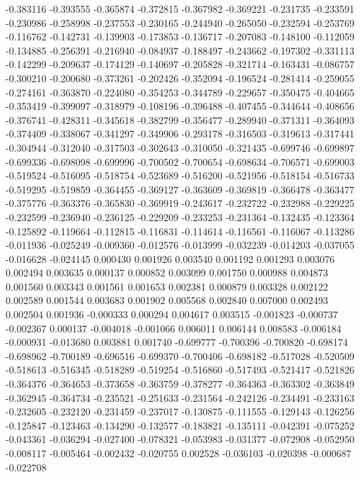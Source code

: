 -0.383116
-0.393555
-0.365874
-0.372815
-0.367982
-0.369221
-0.231735
-0.233591
-0.230986
-0.258998
-0.237553
-0.230165
-0.244940
-0.265050
-0.232594
-0.253769
-0.116762
-0.142731
-0.139903
-0.173853
-0.136717
-0.207083
-0.148100
-0.112059
-0.134885
-0.256391
-0.216940
-0.084937
-0.188497
-0.243662
-0.197302
-0.331113
-0.142299
-0.209637
-0.174129
-0.140697
-0.205828
-0.321714
-0.163431
-0.086757
-0.300210
-0.200680
-0.373261
-0.202426
-0.352094
-0.196524
-0.281414
-0.259055
-0.274161
-0.363870
-0.224080
-0.354253
-0.344789
-0.229657
-0.350475
-0.404665
-0.353419
-0.399097
-0.318979
-0.108196
-0.396488
-0.407455
-0.344644
-0.408656
-0.376741
-0.428311
-0.345618
-0.382799
-0.356477
-0.289940
-0.371311
-0.364093
-0.374409
-0.338067
-0.341297
-0.349906
-0.293178
-0.316503
-0.319613
-0.317441
-0.304944
-0.312040
-0.317503
-0.302643
-0.310050
-0.321435
-0.699746
-0.699897
-0.699336
-0.698098
-0.699996
-0.700502
-0.700654
-0.698634
-0.706571
-0.699003
-0.519524
-0.516095
-0.518754
-0.523689
-0.516200
-0.521956
-0.518154
-0.516733
-0.519295
-0.519859
-0.364455
-0.369127
-0.363609
-0.369819
-0.366478
-0.363477
-0.375776
-0.363376
-0.365830
-0.369919
-0.243617
-0.232722
-0.232988
-0.229225
-0.232599
-0.236940
-0.236125
-0.229209
-0.233253
-0.231364
-0.132435
-0.123364
-0.125892
-0.119664
-0.112815
-0.116831
-0.114614
-0.116561
-0.116067
-0.113286
-0.011936
-0.025249
-0.009360
-0.012576
-0.013999
-0.032239
-0.014203
-0.037055
-0.016628
-0.024145
0.000430
0.001926
0.003540
0.001192
0.001293
0.003076
0.002494
0.003635
0.000137
0.000852
0.003099
0.001750
0.000988
0.004873
0.001560
0.003343
0.001561
0.001653
0.002381
0.000879
0.003328
0.002122
0.002589
0.001544
0.003683
0.001902
0.005568
0.002840
0.007000
0.002493
0.002504
0.001936
-0.000333
0.000294
0.004617
0.003515
-0.001823
-0.000737
-0.002367
0.000137
-0.004018
-0.001066
0.006011
0.006144
0.008583
-0.006184
-0.000931
-0.013680
0.003881
0.001740
-0.699777
-0.700396
-0.700820
-0.698174
-0.698962
-0.700189
-0.696516
-0.699370
-0.700406
-0.698182
-0.517028
-0.520509
-0.518613
-0.516345
-0.518289
-0.519254
-0.516860
-0.517493
-0.521417
-0.521826
-0.364376
-0.364653
-0.373658
-0.363759
-0.378277
-0.364363
-0.363302
-0.363849
-0.362945
-0.364734
-0.235521
-0.251633
-0.231564
-0.242126
-0.234491
-0.233163
-0.232605
-0.232120
-0.231459
-0.237017
-0.130875
-0.111555
-0.129143
-0.126256
-0.125847
-0.123463
-0.134290
-0.132577
-0.183821
-0.135111
-0.042391
-0.075252
-0.043361
-0.036294
-0.027400
-0.078321
-0.053983
-0.031377
-0.072908
-0.052950
-0.008117
-0.005464
-0.002432
-0.020755
0.002528
-0.036103
-0.020398
-0.000687
-0.022708
